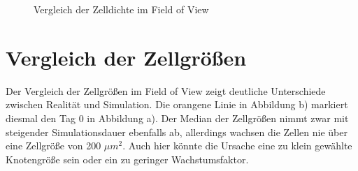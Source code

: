 \documentclass[11pt,a4paper,pointlessnumbers]{scrreprt}  %
\begin{document}
\begin{figure}[!ht]
	\caption{Vergleich der Zelldichte im Field of View} 
	\label{fig:Zelldichte}
\end{figure} 

\newpage
\section{Vergleich der Zellgrößen}
Der Vergleich der Zellgrößen im Field of View zeigt deutliche Unterschiede zwischen Realität und Simulation. Die orangene Linie in Abbildung b) markiert diesmal den Tag 0 in Abbildung a). Der Median der Zellgrößen nimmt zwar mit steigender Simulationsdauer ebenfalls ab, allerdings wachsen die Zellen nie über eine Zellgröße von 200 $\mu m^2$. Auch hier könnte die Ursache eine zu klein gewählte Knotengröße sein oder ein zu geringer Wachstumsfaktor.
\end{document}
